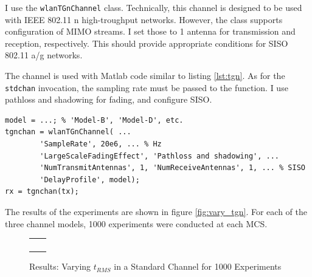 I use the \texttt{wlanTGnChannel} class. Technically, this channel is designed to be used with IEEE 802.11 n high-troughput networks. However, the class supports configuration of MIMO streams. I set those to 1 antenna for transmission and reception, respectively. This should provide appropriate conditions for SISO 802.11 a/g networks.

The channel is used with Matlab code similar to listing \ref{lst:tgn}. As for the \texttt{stdchan} invocation, the sampling rate must be passed to the function. I use pathloss and shadowing for fading, and configure SISO.

\begin{lstlisting}[captionpos=b,caption={Matlab wlanTGnChannel Simulation},label=lst:tgn]
model = ...; % 'Model-B', 'Model-D', etc.
tgnchan = wlanTGnChannel( ...
        'SampleRate', 20e6, ... % Hz
        'LargeScaleFadingEffect', 'Pathloss and shadowing', ...
        'NumTransmitAntennas', 1, 'NumReceiveAntennas', 1, ... % SISO
        'DelayProfile', model);
rx = tgnchan(tx);
\end{lstlisting}

The results of the experiments are shown in figure \ref{fig:vary_tgn}. For each of the three channel models, 1000 experiments were conducted at each \gls{MCS}.

\begin{figure}[p]
	\centering
	\setlength\figureheight{3cm}
	\setlength{}
	\begin{tabular}{cc}
		\subfloat[MCS 0]{} &
		\subfloat[MCS 1]{} \\
		\subfloat[MCS 2]{} &
		\subfloat[MCS 3]{} \\
		\subfloat[MCS 4]{} &
		\subfloat[MCS 5]{} \\
		\subfloat[MCS 6]{} &
		\subfloat[MCS 7]{} \\
	\end{tabular}
	\caption{Results: Varying $t_{RMS}$ in a Standard Channel for 1000 Experiments}
	\label{fig:vary_trms}
\end{figure}

